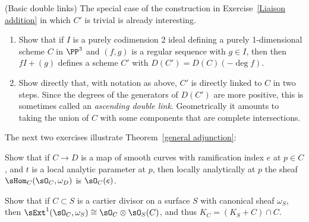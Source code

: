 \begin{exercise}(Basic double links)\label{Basic double links}
The special case of the construction in Exercise~\ref{Liaison addition} in which $C'$ is trivial is already interesting. 

\begin{enumerate}
 \item Show that if $I$ is a purely codimension 2 ideal
 defining a purely 1-dimensional scheme $C$ in $\PP^3$
 and $(f, g)$ is a regular sequence with $g\in I$, then
 then  $fI+(g)$ defines a scheme $C'$ with $D(C') = D(C)(-\deg f)$.

 \item Show directly that, with notation as above, $C'$ is directly linked to $C$
 in two steps.  Since the degrees of the generators of $D(C')$ are more positive, this
 is sometimes called an \emph{ascending double link}. Geometrically it amounts to taking the
 union of $C$ with some  components that are complete intersections.
 \end{enumerate}

\end{exercise}

The next two exercises illustrate Theorem~\ref{general adjunction}:

\begin{exercise}\label{codimension0}
Show that if $C\to D$ is a map of smooth curves with ramification index $e$ at $p\in C$, and $t$ is a local
analytic parameter at $p$, then 
locally analytically at $p$ the sheaf $\sHom_C(\sO_C, \omega_D)$ is $\sO_C(e)$.
\end{exercise}

\begin{exercise}\label{codimension1}
 Show that if $C\subset S$ is a cartier divisor on a surface $S$ with canonical sheaf $\omega_S$, 
 then $\sExt^1(\sO_C, \omega_S) \cong \sO_C\otimes \sO_S(C)$, and thus $K_C = (K_S+C)\cap C$.
\end{exercise}



